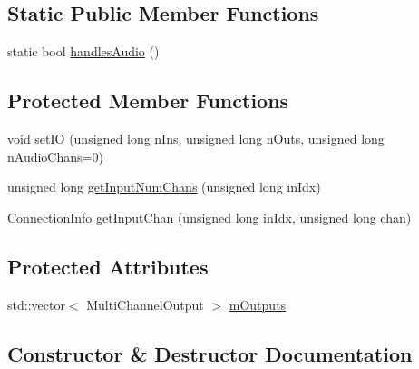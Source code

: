 \subsection*{Static Public Member Functions}
\begin{DoxyCompactItemize}
\item 
static bool \hyperlink{class_frame_lib___multi_channel_a2995ef0ba184b2d8a1c44b74f5f39876}{handles\+Audio} ()
\end{DoxyCompactItemize}
\subsection*{Protected Member Functions}
\begin{DoxyCompactItemize}
\item 
void \hyperlink{class_frame_lib___multi_channel_aa602f450561447330df32fe73167244b}{set\+IO} (unsigned long n\+Ins, unsigned long n\+Outs, unsigned long n\+Audio\+Chans=0)
\item 
unsigned long \hyperlink{class_frame_lib___multi_channel_a8ba357b72ac5103d936e7416384294e0}{get\+Input\+Num\+Chans} (unsigned long in\+Idx)
\item 
\hyperlink{struct_frame_lib___multi_channel_1_1_connection_info}{Connection\+Info} \hyperlink{class_frame_lib___multi_channel_a484bbcd67d139f4166c1b731e63d3b92}{get\+Input\+Chan} (unsigned long in\+Idx, unsigned long chan)
\end{DoxyCompactItemize}
\subsection*{Protected Attributes}
\begin{DoxyCompactItemize}
\item 
std\+::vector$<$ Multi\+Channel\+Output $>$ \hyperlink{class_frame_lib___multi_channel_a2d993bc32c4625a1adbd84997c5d74f2}{m\+Outputs}
\end{DoxyCompactItemize}


\subsection{Constructor \& Destructor Documentation}
\mbox{\label{class_frame_lib___multi_channel_a77a5841c9d5efaae5bba85e23279a0de}} 
